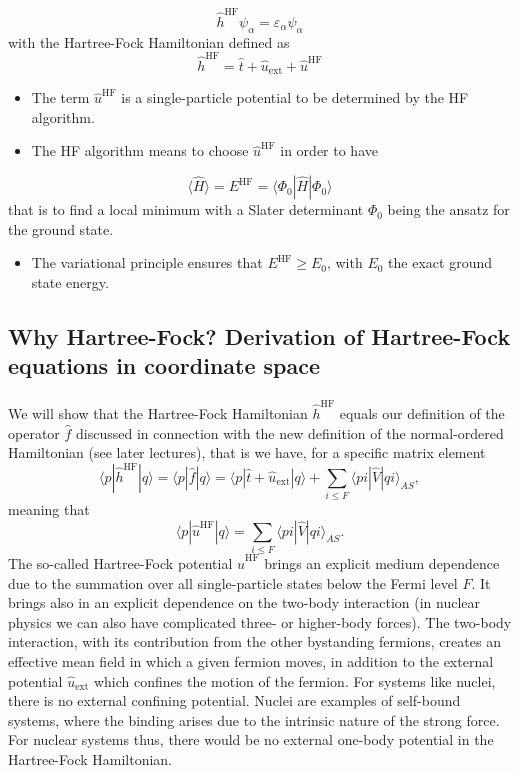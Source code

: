 \documentclass[%
twoside,                 %
final,                   %
10pt]{article}
\begin{document}
\noindent
\[ 
\hat{h}^{\mathrm{HF}}\psi_{\alpha} = \varepsilon_{\alpha}\psi_{\alpha}
\]
with the Hartree-Fock Hamiltonian defined as
\[
\hat{h}^{\mathrm{HF}}=\hat{t}+\hat{u}_{\mathrm{ext}}+\hat{u}^{\mathrm{HF}}
\]
\begin{itemize}
  \item The term  $\hat{u}^{\mathrm{HF}}$ is a single-particle potential to be determined by the HF algorithm.

  \item The HF algorithm means to choose $\hat{u}^{\mathrm{HF}}$ in order to have 
\end{itemize}

\noindent
\[ \langle \hat{H} \rangle = E^{\mathrm{HF}}= \langle \Phi_0 | \hat{H}|\Phi_0 \rangle
\]
that is to find a local minimum with a Slater determinant $\Phi_0$ being the ansatz for the ground state. 
\begin{itemize}
  \item The variational principle ensures that $E^{\mathrm{HF}} \ge E_0$, with $E_0$ the exact ground state energy.
\end{itemize}

\noindent




\subsection{Why Hartree-Fock? Derivation of Hartree-Fock equations in coordinate space}

\paragraph{}
We will show that the Hartree-Fock Hamiltonian $\hat{h}^{\mathrm{HF}}$ equals our definition of the operator $\hat{f}$ discussed in connection with the new definition of the normal-ordered Hamiltonian (see later lectures), that is we have, for a specific matrix element
\[
\langle p |\hat{h}^{\mathrm{HF}}| q \rangle =\langle p |\hat{f}| q \rangle=\langle p|\hat{t}+\hat{u}_{\mathrm{ext}}|q \rangle +\sum_{i\le F} \langle pi | \hat{V} | qi\rangle_{AS},
\]
meaning that
\[
\langle p|\hat{u}^{\mathrm{HF}}|q\rangle = \sum_{i\le F} \langle pi | \hat{V} | qi\rangle_{AS}.
\]
The so-called Hartree-Fock potential $\hat{u}^{\mathrm{HF}}$ brings an explicit medium dependence due to the summation over all single-particle states below the Fermi level $F$. It brings also in an explicit dependence on the two-body interaction (in nuclear physics we can also have complicated three- or higher-body forces). The two-body interaction, with its contribution from the other bystanding fermions, creates an effective mean field in which a given fermion moves, in addition to the external potential $\hat{u}_{\mathrm{ext}}$ which confines the motion of the fermion. For systems like nuclei, there is no external confining potential. Nuclei are examples of self-bound systems, where the binding arises due to the intrinsic nature of the strong force. For nuclear systems thus, there would be no external one-body potential in the Hartree-Fock Hamiltonian.
\end{document}
